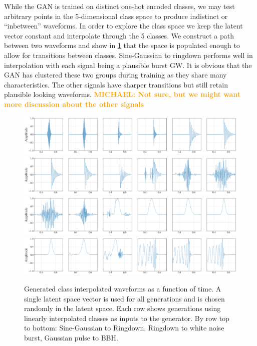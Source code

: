 \documentclass[12pt]{iopart}
\newcommand{\michael}[1]{\textbf{\textcolor{orange}{MICHAEL: #1}}}
\begin{document}
While the \ac{GAN} is trained on distinct one-hot encoded classes, we may test arbitrary points in the 5-dimensional class space to produce indistinct or ``inbetween'' waveforms. In order to explore the class space we keep the latent vector constant and
interpolate through the 5 classes. We construct a path between two waveforms
and show in \cref{fig:c_interp} that the space is populated enough to allow for transitions between
classes.  Sine-Gaussian to ringdown performs well in interpolation with each
signal being a plausible burst GW. It is obvious that the GAN has clustered
these two groups during training as they share many characteristics. The other
signals have sharper transitions but still retain plausible looking waveforms. \michael{Not sure, but we might want more discussion about the other signals}

\begin{figure}
    \centering
    \includegraphics[width=\textwidth]{figures/generations/sg-rd.png}
    \includegraphics[width=\textwidth]{figures/generations/rd-wnb.png}
    \includegraphics[width=\textwidth]{figures/generations/wnb-blip.png}
    \includegraphics[width=\textwidth]{figures/generations/blip-bbh.png}
    \caption{Generated class interpolated waveforms as a function of time. A single latent space vector is used for all generations and is chosen randomly in the latent space. Each row shows generations using linearly interpolated classes as inputs to the generator. By row top to bottom: Sine-Gaussian to Ringdown, Ringdown to white noise burst, Gaussian pulse to BBH.}
    \label{fig:c_interp}
\end{figure}
\end{document}
